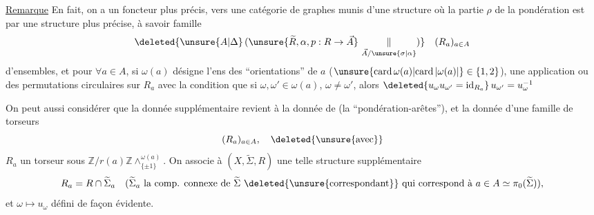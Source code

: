 \uline{Remarque} En fait, on a un foncteur plus précis, vers une catégorie de graphes munis d'une structure où la partie $\rho$ de la pondération est   par une structure plus précise, à savoir   famille
\[
\deleted{\unsure{A|\Delta}\,(\unsure{\widetilde R,\alpha,p:R\to\vec A}\ \underset{\vec A/\unsure{\sigma|\alpha}}{\Vert})}\quad (R_a)_{a\in A}
\]
d'ensembles, et pour $\forall a\in A$, si $\omega(a)$ désigne l'ens des ``orientations'' de $a$ ($\unsure{\mathrm{card}\,\omega(a)|\mathrm{card}\,|\omega(a)|}\in\{1,2\}$), une application
ou des permutations circulaires sur $R_{a}$
avec la condition que si $\omega,\omega'\in\omega(a)$, $\omega\ne\omega'$, alors $\deleted{u_{\omega}u_{\omega'}=\mathrm{id}_{R_{a}}}\,u_{\omega'}=u_{\omega}^{-1}$

On peut aussi considérer que la donnée supplémentaire revient à la donnée de
(la ``pondération-arêtes''), et la donnée d'une famille de torseurs
\[
(R_{a})_{a\in A},\quad \deleted{\unsure{\text{avec}}}
\]
$R_a$ un torseur sous $\mathbb{Z}/r(a)\mathbb{Z}\wedge_{\{\pm1\}}^{\omega(a)}$. On associe à $(X,\widetilde{\Sigma},R)$ une telle structure supplémentaire
\[
R_{a}=R\cap\widetilde{\Sigma}_{a}\quad
(\widetilde{\Sigma}_{a}\ \text{la comp. connexe de }\widetilde{\Sigma}\
\deleted{\unsure{\text{correspondant}}}\ \text{qui correspond à } a\in A\simeq\pi_{0}(\widetilde{\Sigma})),
\]
et $\omega\mapsto u_{\omega}$ défini de façon évidente.

